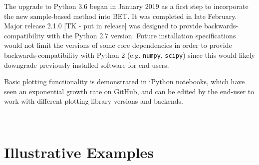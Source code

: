 The upgrade to Python 3.6 began in January 2019 as a first step to incorporate the new sample-based method into BET. 
It was completed in late February. 
Major release 2.1.0 [TK - put in release] was designed to provide backwards-compatibility with the Python 2.7 version. 
Future installation specifications would not limit the versions of some core dependencies in order to provide backwards-compatibility with Python 2 (e.g. {\tt numpy}, {\tt scipy}) since this would likely downgrade previously installed software for end-users. 

Basic plotting functionality is demonstrated in iPython notebooks, which have seen an exponential growth rate on GitHub, and can be edited by the end-user to work with different plotting library versions and backends.




\
\section{Illustrative Examples}



